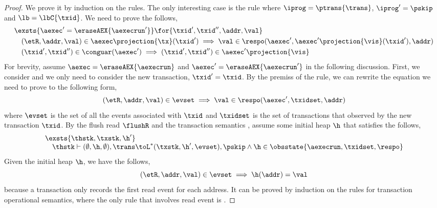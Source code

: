 \begin{proof}
    We prove it by induction on the rules.
    The only interesting case is the  rule where \( \iprog = \ptrans{\trans} \), \( \iprog' = \pskip \) and \( \lb = \lbC{\txid} \).
    We need to prove the follows,
    \begin{align}
        & \exsts{\aexec' = \eraseAEX{\aexecrun'}} \for{ \txid', \txid'', \addr, \val}  \nonumber \\
        & \quad (\etR, \addr, \val) \in \aexec\projection{\tx}(\txid') \implies \val \in \respo(\aexec',\aexec'\projection{\vis}(\txid'), \addr) \label{equ:res_policy}\\
        & \quad (\txid', \txid'') \in \conguar(\aexec') \implies (\txid', \txid'') \in \aexec'\projection{\vis} \label{equ:con_guarantee}
    \end{align}
    For brevity, assume \( \aexec = \eraseAEX{\aexecrun} \) and \( \aexec' = \eraseAEX{\aexecrun'} \) in the following discussion.
    First, we consider  and we only need to consider the new transaction, \ie \( \txid' = \txid \).
    By the premiss of the rule, we can rewrite the equation we need to prove to the following form,
    \[
        (\etR, \addr, \val) \in \evset \implies \val \in \respo(\aexec',\txidset, \addr) \\
    \]
    where \( \evset \) is the set of all the events associated with \( \txid \) and \( \txidset \) is the set of transactions that observed by the new transaction \( \txid \).
    By the flush read \( \flushR \)  and the transaction semantics , assume some initial heap \( \h \) that satisfies the follows,
    \[
    \begin{array}{@{}l@{}}
        \exsts{\thstk, \txstk, \h'} \nonumber \\
        \quad \thstk \vdash (\emptyset, \h, \emptyset), \trans \toL^{*} (\txstk, \h', \evset), \pskip 
        \land \h \in \obsstate{\aexecrun, \txidset, \respo} \nonumber \\
    \end{array}
    \]
    Given the initial heap \( \h \), we have the follows,
    \begin{equation}
        \label{equ:first-read-from-the-init-heap} 
        (\etR, \addr, \val) \in \evset \implies \h(\addr) = \val
    \end{equation}
    because a transaction only records the first read event for each address.
    It can be proved by induction on the rules for transaction operational semantics, where the only rule that involves read event is .

\end{proof}
